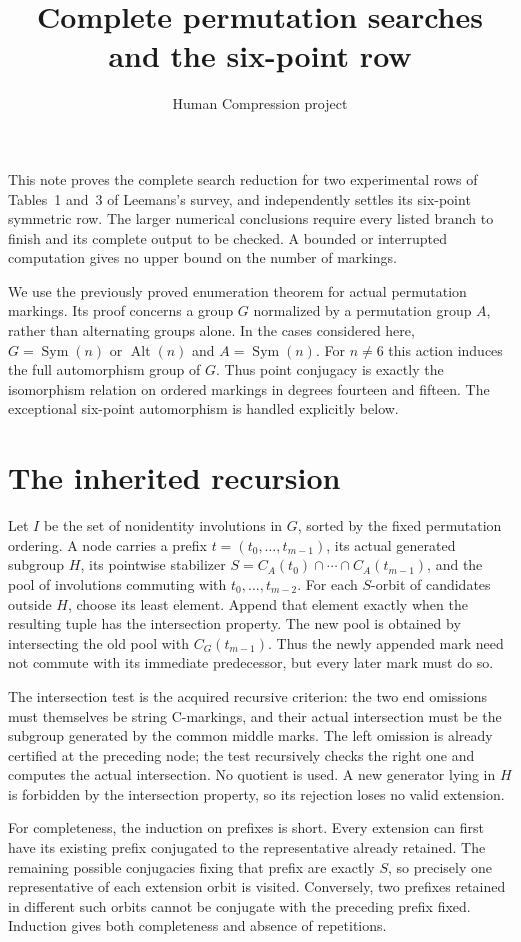 \documentclass[11pt,a4paper]{article}
\title{Complete permutation searches and the six-point row}
\author{Human Compression project}\date{}
\newcommand{\Sym}{\operatorname{Sym}}
\newcommand{\Alt}{\operatorname{Alt}}
\begin{document}
\maketitle
This note proves the complete search reduction for two experimental rows of
Tables~1 and~3 of Leemans's survey, and independently settles its six-point
symmetric row. The larger numerical conclusions require every listed branch
to finish and its complete output to be checked. A bounded or interrupted
computation gives no upper bound on the number of markings.

We use the previously proved enumeration theorem for actual permutation
markings. Its proof concerns a group $G$ normalized by a permutation group
$A$, rather than alternating groups alone. In the cases considered here,
$G=\Sym(n)$ or $\Alt(n)$ and $A=\Sym(n)$. For $n\ne6$ this action induces
the full automorphism group of $G$. Thus point conjugacy is exactly the
isomorphism relation on ordered markings in degrees fourteen and fifteen.
The exceptional six-point automorphism is handled explicitly below.

\section{The inherited recursion}
Let $I$ be the set of nonidentity involutions in $G$, sorted by the fixed
permutation ordering. A node carries a prefix
$t=(t_0,\ldots,t_{m-1})$, its actual generated subgroup $H$, its pointwise
stabilizer $S=C_A(t_0)\cap\cdots\cap C_A(t_{m-1})$, and the pool of
involutions commuting with $t_0,\ldots,t_{m-2}$. For each $S$-orbit of
candidates outside $H$, choose its least element. Append that element
exactly when the resulting tuple has the intersection property.
The new pool is obtained by intersecting the old pool with
$C_G(t_{m-1})$. Thus the newly appended mark need not commute with its
immediate predecessor, but every later mark must do so.

The intersection test is the acquired recursive criterion: the two end
omissions must themselves be string C-markings, and their actual
intersection must be the subgroup generated by the common middle marks.
The left omission is already certified at the preceding node; the test
recursively checks the right one and computes the actual intersection.
No quotient is used. A new generator lying in $H$ is forbidden by the
intersection property, so its rejection loses no valid extension.

For completeness, the induction on prefixes is short. Every extension
can first have its existing prefix conjugated to the representative
already retained. The remaining possible conjugacies fixing that prefix
are exactly $S$, so precisely one representative of each extension orbit
is visited. Conversely, two prefixes retained in different such orbits
cannot be conjugate with the preceding prefix fixed. Induction gives
both completeness and absence of repetitions.
\end{document}
